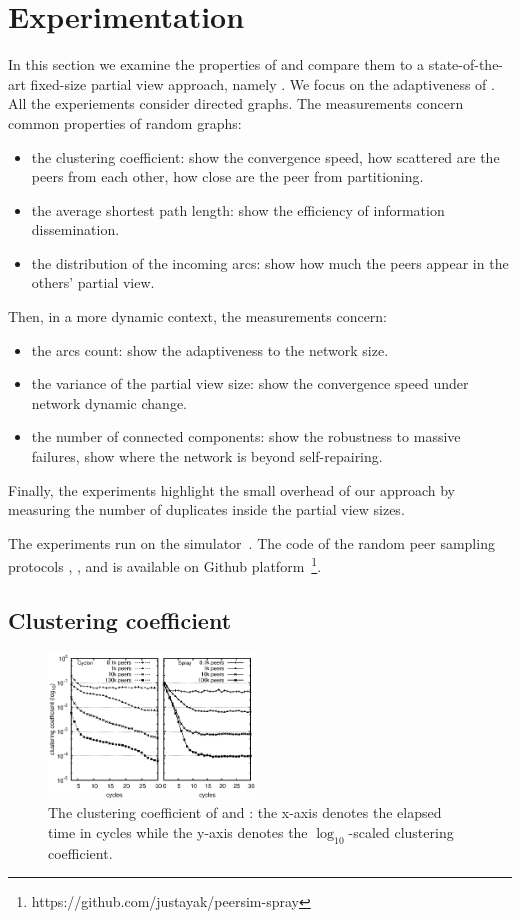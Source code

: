 \section{Experimentation}
\label{sec:experiments}

In this section we examine the properties of \SPRAY and compare them to a
state-of-the-art fixed-size partial view approach, namely \CYCLON. We focus on
the adaptiveness of \SPRAY. All the experiements consider directed graphs. The
measurements concern common properties of random graphs:
\begin{itemize}
\item the clustering coefficient: show the convergence speed, how scattered
  are the peers from each other, how close are the peer from partitioning.
\item the average shortest path length: show the efficiency of information
  dissemination.
\item the distribution of the incoming arcs: show how much the peers appear
  in the others' partial view.
\end{itemize}
Then, in a more dynamic context, the measurements concern:
\begin{itemize}
\item the arcs count: show the adaptiveness to the network size.
\item the variance of the partial view size: show the convergence speed under
  network dynamic change.
\item the number of connected components: show the robustness to massive
  failures, show where the network is beyond self-repairing.
\end{itemize}
Finally, the experiments highlight the small overhead of our approach by
measuring the number of duplicates inside the partial view sizes.

The experiments run on the \PEERSIM
simulator~\cite{montresor2009peersim}. The code of the random peer sampling
protocols \CYCLON, \SCAMP, and \SPRAY is available on Github
platform~\footnote{https://github.com/justayak/peersim-spray}.

\subsection{Clustering coefficient}
\label{subsec:cluster}

\begin{figure}
  \centering
  \includegraphics[width=0.49\textwidth]{img/cluster.eps}
  \caption{\label{fig:clustering}The clustering coefficient of \CYCLON and
    \SPRAY: the x-axis denotes the elapsed time in cycles while the y-axis
    denotes the $\log_{10}$-scaled clustering coefficient.}
\end{figure}

